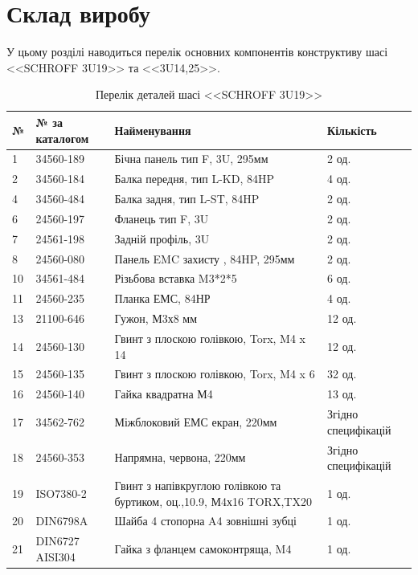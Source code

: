 \section{Склад виробу}
У цьому розділі наводиться перелік основних компонентів конструктиву шасі <<SCHROFF 3U19>> та <<3U14,25>>.
\begin{table}[H]
    \centering
  \caption{Перелік деталей шасі <<SCHROFF 3U19>>}
     \begin{tabular}{|p{0.8cm}|p{3.2cm}|p{7.5cm}|p{2cm}|} 
        \hline
        \textbf{№} & \textbf{№ за каталогом} & \textbf{Найменування} & \textbf{Кількість} \\ \hline
        1 & 34560-189 & Бічна панель тип F, 3U, 295мм  & 2 од. \\ \hline
        2 & 34560-184 & Балка передня, тип L-KD, 84HP & 4 од. \\ \hline
        4 & 34560-484 & Балка задня, тип L-ST, 84HP & 2 од. \\ \hline
        6 & 24560-197 & Фланець тип F, 3U & 2 од. \\ \hline
        7 & 24561-198 & Задній профіль, 3U & 2 од. \\ \hline
        8 & 24560-080 & Панель EMC захисту , 84HP, 295мм & 2 од. \\ \hline
       10 & 34561-484 & Різьбова вставка M3*2*5 & 6 од. \\ \hline
       11 & 24560-235 & Планка ЕМС, 84НР & 4 од. \\ \hline
       13 & 21100-646 & Гужон, М3х8 мм & 12 од. \\ \hline
       14 & 24560-130 & Гвинт з плоскою голівкою, Torx, M4 x 14 & 12 од. \\ \hline
       15 & 24560-135 & Гвинт з плоскою голівкою, Torx, M4 x 6 & 32 од. \\ \hline
       16 & 24560-140 & Гайка квадратна М4 & 13 од. \\ \hline
       17 & 34562-762 & Міжблоковий ЕМС екран, 220мм & Згідно специфікацій \\ \hline
       18 & 24560-353 & Напрямна, червона, 220мм & Згідно специфікацій \\ \hline
       19 & ISO7380-2 & Гвинт з напівкруглою голівкою та буртиком, оц.,10.9, М4х16 TORX,TX20 & 1 од. \\ \hline
       20 & DIN6798A & Шайба 4 стопорна A4 зовнішні зубці & 1 од. \\ \hline
       21 & DIN6727 AISI304 & Гайка з фланцем самоконтряща, M4 & 1 од. \\ \hline

\end{tabular}
\end{table}
